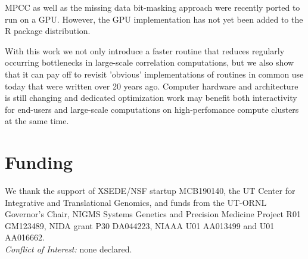 \documentclass{bioinfo}
\begin{document}
MPCC as well as the missing data bit-masking approach were recently ported 
to run on a GPU. However, the GPU implementation has not yet been added to 
the R package distribution.

With this work we not only introduce a faster routine that reduces
regularly occurring bottlenecks in large-scale correlation computations, but
we also show that it can pay off to revisit 'obvious' implementations
of routines in common use today that were written over 20 years
ago. Computer hardware and architecture is still changing and
dedicated optimization work may benefit both interactivity for
end-users and large-scale computations on high-perfomance compute
clusters at the same time.

\section*{Funding}

We thank the support of XSEDE/NSF startup MCB190140, the UT Center for
Integrative and Translational Genomics, and funds from the UT-ORNL
Governor's Chair, NIGMS Systems Genetics and Precision Medicine
Project R01 GM123489, NIDA grant P30 DA044223, NIAAA U01 AA013499 and
U01 AA016662.\\
\textit{Conflict of Interest:} none declared.

\vspace*{-5mm}


\end{document}
